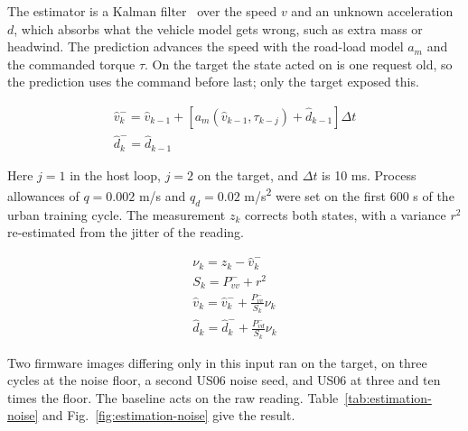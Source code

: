\documentclass{ieeeaccess}
\begin{document}
The estimator is a Kalman filter~\cite{kalman1960} over the speed $v$ and an unknown acceleration $d$, which absorbs what the vehicle model gets wrong, such as extra mass or headwind. The prediction advances the speed with the road-load model $a_{m}$ and the commanded torque $\tau$. On the target the state acted on is one request old, so the prediction uses the command before last; only the target exposed this.

\begin{equation}
\label{eq:estimation-predict}
\begin{gathered}\hat{v}^{-}_{k} = \hat{v}_{k-1} + \left[ a_{m}(\hat{v}_{k-1}, \tau_{k-j}) + \hat{d}_{k-1} \right] \Delta t \\ \hat{d}^{-}_{k} = \hat{d}_{k-1}\end{gathered}
\end{equation}

Here $j = 1$ in the host loop, $j = 2$ on the target, and $\Delta t$ is 10 ms. Process allowances of $q = 0.002$ m/s and $q_{d} = 0.02$ m/s\textsuperscript{2} were set on the first 600 s of the urban training cycle. The measurement $z_{k}$ corrects both states, with a variance $r^{2}$ re-estimated from the jitter of the reading.

\begin{equation}
\label{eq:estimation-update}
\begin{gathered}\nu_{k} = z_{k} - \hat{v}^{-}_{k} \\ S_{k} = P^{-}_{vv} + r^{2} \\ \hat{v}_{k} = \hat{v}^{-}_{k} + \frac{P^{-}_{vv}}{S_{k}} \nu_{k} \\ \hat{d}_{k} = \hat{d}^{-}_{k} + \frac{P^{-}_{vd}}{S_{k}} \nu_{k}\end{gathered}
\end{equation}

Two firmware images differing only in this input ran on the target, on three cycles at the noise floor, a second US06 noise seed, and US06 at three and ten times the floor. The baseline acts on the raw reading. Table~\ref{tab:estimation-noise} and Fig.~\ref{fig:estimation-noise} give the result.
\end{document}
